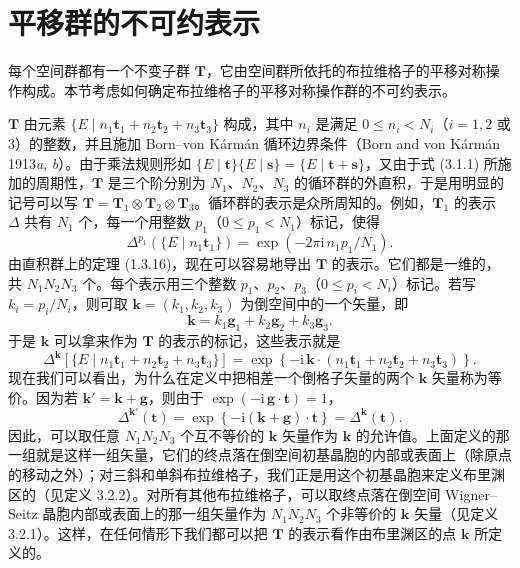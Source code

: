 \section{平移群的不可约表示}

每个空间群都有一个不变子群 $\mathbf{T}$，它由空间群所依托的布拉维格子的平移对称操作构成。本节考虑如何确定布拉维格子的平移对称操作群的不可约表示。

$\mathbf{T}$ 由元素 $\{E \mid n_{1}\mathbf{t}_{1} + n_{2}\mathbf{t}_{2} + n_{3}\mathbf{t}_{3}\}$ 构成，其中 $n_{i}$ 是满足 $0 \leqslant n_{i} < N_{i}$（$i = 1, 2$ 或 3）的整数，并且施加 Born--von Kármán 循环边界条件（Born and von Kármán 1913\textit{a}, \textit{b}）。由于乘法规则形如 $\{E \mid \mathbf{t}\}\{E \mid \mathbf{s}\} = \{E \mid \mathbf{t} + \mathbf{s}\}$，又由于式 (3.1.1) 所施加的周期性，$\mathbf{T}$ 是三个阶分别为 $N_{1}$、$N_{2}$、$N_{3}$ 的循环群的外直积，于是用明显的记号可以写 $\mathbf{T} = \mathbf{T}_{1} \otimes \mathbf{T}_{2} \otimes \mathbf{T}_{3}$。循环群的表示是众所周知的。例如，$\mathbf{T}_{1}$ 的表示 $\Delta$ 共有 $N_{1}$ 个，每一个用整数 $p_{1}$（$0 \leqslant p_{1} < N_{1}$）标记，使得
\begin{equation*}
\Delta^{p_{1}}(\{E \mid n_{1}\mathbf{t}_{1}\}) = \exp(-2\pi\mathrm{i}\, n_{1}p_{1}/N_{1}).
\tag{3.4.1}
\end{equation*}
由直积群上的定理 (1.3.16)，现在可以容易地导出 $\mathbf{T}$ 的表示。它们都是一维的，共 $N_{1}N_{2}N_{3}$ 个。每个表示用三个整数 $p_{1}$、$p_{2}$、$p_{3}$（$0 \leqslant p_{i} < N_{i}$）标记。若写 $k_{i} = p_{i}/N_{i}$，则可取 $\mathbf{k} = (k_{1}, k_{2}, k_{3})$ 为倒空间中的一个矢量，即
\begin{equation*}
\mathbf{k} = k_{1}\mathbf{g}_{1} + k_{2}\mathbf{g}_{2} + k_{3}\mathbf{g}_{3}.
\tag{3.4.2}
\end{equation*}
于是 $\mathbf{k}$ 可以拿来作为 $\mathbf{T}$ 的表示的标记，这些表示就是
\begin{equation*}
\Delta^{\mathbf{k}}\left[\{E \mid n_{1}\mathbf{t}_{1} + n_{2}\mathbf{t}_{2} + n_{3}\mathbf{t}_{3}\}\right] = \exp\left\{-\mathrm{i}\,\mathbf{k} \cdot (n_{1}\mathbf{t}_{1} + n_{2}\mathbf{t}_{2} + n_{3}\mathbf{t}_{3})\right\}.
\tag{3.4.3}
\end{equation*}
现在我们可以看出，为什么在定义中把相差一个倒格子矢量的两个 $\mathbf{k}$ 矢量称为等价。因为若 $\mathbf{k}' = \mathbf{k} + \mathbf{g}$，则由于 $\exp(-\mathrm{i}\,\mathbf{g} \cdot \mathbf{t}) = 1$，
\begin{equation*}
\Delta^{\mathbf{k}'}(\mathbf{t}) = \exp\left\{-\mathrm{i}(\mathbf{k} + \mathbf{g}) \cdot \mathbf{t}\right\} = \Delta^{\mathbf{k}}(\mathbf{t}).
\tag{3.4.4}
\end{equation*}
因此，可以取任意 $N_{1}N_{2}N_{3}$ 个互不等价的 $\mathbf{k}$ 矢量作为 $\mathbf{k}$ 的允许值。上面定义的那一组就是这样一组矢量，它们的终点落在倒空间初基晶胞的内部或表面上（除原点的移动之外）；对三斜和单斜布拉维格子，我们正是用这个初基晶胞来定义布里渊区的（见定义 3.2.2）。对所有其他布拉维格子，可以取终点落在倒空间 Wigner--Seitz 晶胞内部或表面上的那一组矢量作为 $N_{1}N_{2}N_{3}$ 个非等价的 $\mathbf{k}$ 矢量（见定义 3.2.1）。这样，在任何情形下我们都可以把 $\mathbf{T}$ 的表示看作由布里渊区的点 $\mathbf{k}$ 所定义的。

